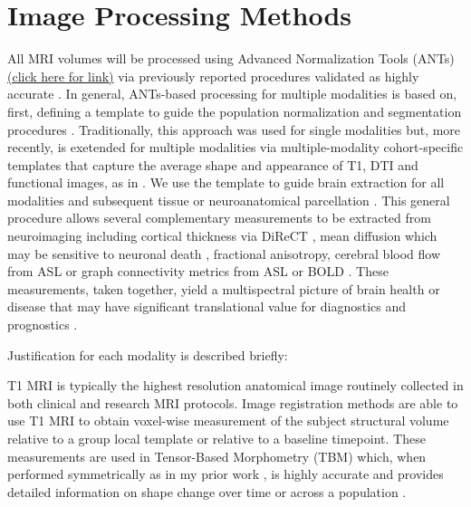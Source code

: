 \section{Image Processing Methods}

All MRI volumes will be processed using Advanced Normalization Tools
(ANTs) \href{http://www.picsl.upenn.edu/ANTS}{(click here for
link)}\cite{Avants2011a,Avants2011,Murphy2011,Tustison2010,Tustison2011,Tustison2011a}
via previously reported procedures validated as highly accurate
\cite{Klein2009,Klein2010,Murphy2011,Avants2011}.  In general, ANTs-based
processing for multiple modalities is based on, first, defining a
template to guide the population normalization and segmentation
procedures \cite{Avants2011a,Avants2011}.  Traditionally, this
approach was used for single modalities but, more recently, is
exetended for multiple modalities via multiple-modality cohort-specific templates
that capture the average shape and appearance of T1, DTI and
functional images, as in \cite{Kim2010,Avants2011a,Jain2012,Tustison2012}.  We use the
template to guide brain extraction for all modalities and subsequent
tissue or neuroanatomical parcellation \cite{Avants2011a}.  
This general procedure allows several complementary measurements to be
extracted from neuroimaging including 
cortical thickness via DiReCT \cite{Das2009a}, mean diffusion which
may be sensitive to neuronal death \cite{}, fractional anisotropy,
cerebral blood flow from ASL \cite{Jain2012} or graph connectivity metrics from ASL or
BOLD \cite{}.  These measurements, taken together, yield a
multispectral picture of brain health or disease that may have
significant translational value for diagnostics \cite{McMillan2013a} and prognostics \cite{Yuh2013}.

Justification for each modality is described briefly: 

  T1 MRI is
typically the highest resolution anatomical image routinely collected
in both clinical and research MRI protocols.  Image registration
methods are able to use T1 MRI to obtain voxel-wise measurement of the
subject structural volume relative to a group local template or
relative to a baseline timepoint.  These measurements are used in
Tensor-Based Morphometry (TBM) which, when performed symmetrically as
in my prior work \cite{Yushkevich2010a,Das2012}, is highly accurate
and provides detailed information on shape change over time
\cite{Brambati2007,Hua2011,Kim2013} or across a population \cite{Kim2008,Massimo2009,Morgan2011,Hanson2010,Hanson2012}.

